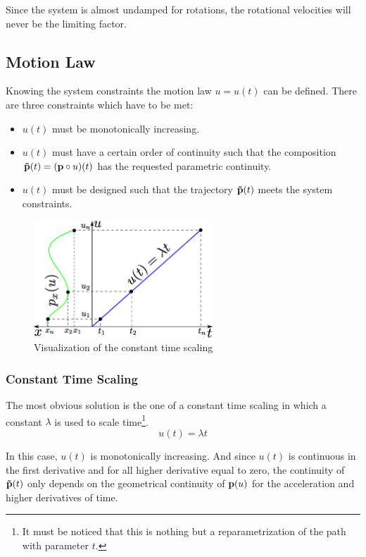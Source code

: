 Since the system is almost undamped for rotations, the rotational velocities will never be the limiting factor.

\subsection{Motion Law}
\label{subsec:motionLaw}
Knowing the system constraints the motion law $u=u(t)$ can be defined. There are three constraints which have to be met:

\begin{itemize}
\item $u(t)$ must be monotonically increasing.
\item $u(t)$ must have a certain order of continuity such that the composition ${\bf \tilde{p}}(t)=({\bf p}\circ u)(t)$ has the requested parametric continuity.
\item $u(t)$ must be designed such that the trajectory ${\bf \tilde{p}}(t)$ meets the system constraints.
\end{itemize}

\begin{figure}[H]
	\centering
    \includegraphics[width = 0.6\textwidth]{graphics/constantTimeScaling.eps}
  \caption{Visualization of the constant time scaling}
  \label{fig:constantTimeScaling}
\end{figure}

\subsubsection{Constant Time Scaling}
The most obvious solution is the one of a constant time scaling in which a constant $\lambda$ is used to scale time\footnote{It must be noticed that this is nothing but a reparametrization of the path with parameter $t$.}.
\begin{equation}
u(t) = \lambda t
\end{equation}

In this case, $u(t)$ is monotonically increasing. And since $u(t)$ is continuous in the first derivative and for all higher derivative equal to zero, the continuity of ${\bf \tilde{p}}(t)$ only depends on the geometrical continuity of ${\bf p}(u)$ for the acceleration and higher derivatives of time.

